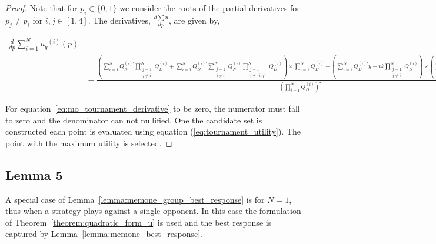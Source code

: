 \begin{proof}
    Note that for \(p_i \in
    \{0, 1\}\) we consider the roots of the partial derivatives for \(p_j \neq
    p_i\) for \(i,j \in [1, 4]\). The derivatives, \(\frac{d\sum u}{dp}\), are
    given by,

    {\scriptsize
    \begin{align}\label{eq:mo_tournament_derivative}
        \frac{d}{dp} \sum\limits_{i=1} ^ {N} {u_q}^{(i)} (p) & = \nonumber \\
        & =\frac{
        (\sum\limits_{i=1} ^ {N} Q_{N}^{(i)'} \prod_{\substack{j=1 \\ j \neq i}} ^ N Q_{D}^{(i)}
        + \sum\limits_{i=1} ^ {N} Q_{D}^{(i)'} \sum_{\substack{j=1 \\ j \neq i}} ^ {N} Q_{N}^{(i)}
       \prod_{\substack{j=1 \\ j \neq \{i, j\}}} ^ N Q_{D}^{(i)}) \times
       \prod\limits_{i=1} ^ N Q_{D}^{(i)} - (\sum\limits_{i=1} ^ {N} Q_{D}^{(i)'}y-vk
       \prod_{\substack{j=1 \\ j \neq i}} ^ N Q_{D}^{(i)}) \times
       (\sum\limits_{i=1} ^ {N} Q_{N}^{(i)} \prod_{\substack{j=1 \\ j \neq i}} ^ N Q_{D}^{(i)})}
        {(\prod\limits_{i=1} ^ N Q_{D}^{(i)})^{2}}
    \end{align}
    }

    For equation~\ref{eq:mo_tournament_derivative} to be zero, the numerator
    must fall to zero and the denominator can not nullified. One the candidate
    set is constructed each point is evaluated using equation
    (\ref{eq:tournament_utility}). The point with the maximum utility is
    selected.
\end{proof}


\subsection{Lemma 5}

A special case of Lemma~\ref{lemma:memone_group_best_response} is for \(N=1\),
thus when a strategy plays against a single opponent. In this case the formulation
of Theorem~\ref{theorem:quadratic_form_u} is used and the best response is captured
by Lemma~\ref{lemma:memone_best_response}.

